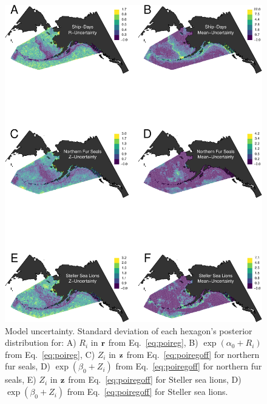 \documentclass[11pt, titlepage]{article}
\begin{document}
\begin{spacing}{1.9}
\begin{flushleft}
\begin{figure}[H]
  \begin{center}
  \includegraphics[width=.8\linewidth]{figures/Fig-Uncertainty}
  \end{center}
  \caption{Model uncertainty. Standard deviation of each hexagon's posterior distribution  for: A) $R_{i}$ in $\mathbf{r}$ from Eq.~\eqref{eq:poireg}, B) $\exp(\alpha_{0} + R_{i})$ from Eq.~\eqref{eq:poireg}, C) $Z_{i}$ in $\mathbf{z}$ from Eq.~\eqref{eq:poiregoff} for northern fur seals, D) $\exp(\beta_{0} + Z_{i})$ from Eq.~\eqref{eq:poiregoff} for northern fur seals, E) $Z_{i}$ in $\mathbf{z}$ from Eq.~\eqref{eq:poiregoff} for Steller sea lions, D) $\exp(\beta_{0} + Z_{i})$ from Eq.~\eqref{eq:poiregoff} for Steller sea lions.
  \label{Fig-Uncertainty}}         
\end{figure} 


\end{flushleft}
\end{spacing}
\end{document}
